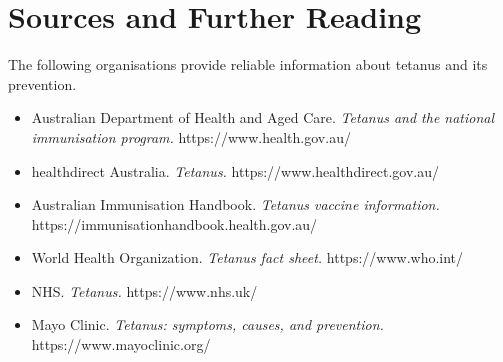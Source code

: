 \section*{Sources and Further Reading}
The following organisations provide reliable information about tetanus and its prevention.

\begin{itemize}
    \item Australian Department of Health and Aged Care. \textit{Tetanus and the national immunisation program.} https://www.health.gov.au/
    \item healthdirect Australia. \textit{Tetanus.} https://www.healthdirect.gov.au/
    \item Australian Immunisation Handbook. \textit{Tetanus vaccine information.} https://immunisationhandbook.health.gov.au/
    \item World Health Organization. \textit{Tetanus fact sheet.} https://www.who.int/
    \item NHS. \textit{Tetanus.} https://www.nhs.uk/
    \item Mayo Clinic. \textit{Tetanus: symptoms, causes, and prevention.} https://www.mayoclinic.org/
\end{itemize}

\clearpage
